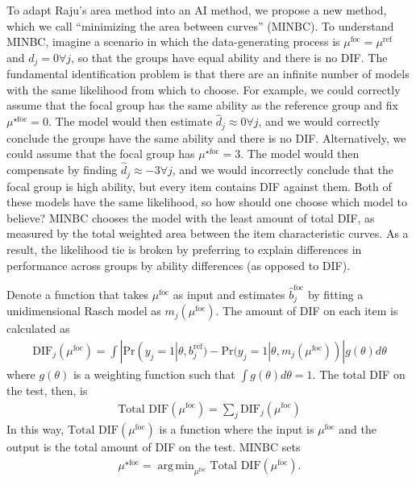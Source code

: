 \documentclass[
  11pt,
]{article}
\begin{document}
To adapt Raju's area method into an AI method, we propose a new method, which we call \enquote{minimizing the area between curves} (MINBC). To understand MINBC, imagine a scenario in which the data-generating process is \(\mu^{\text{foc}} = \mu^{\text{ref}}\) and \(d_j = 0 \forall j\), so that the groups have equal ability and there is no DIF. The fundamental identification problem is that there are an infinite number of models with the same likelihood from which to choose. For example, we could correctly assume that the focal group has the same ability as the reference group and fix \(\mu^{\star\text{foc}} = 0\). The model would then estimate \(\hat d_j \approx 0 \forall j\), and we would correctly conclude the groups have the same ability and there is no DIF. Alternatively, we could assume that the focal group has \(\mu^{\star\text{foc}} = 3\). The model would then compensate by finding \(\hat d_j \approx -3 \forall j\), and we would incorrectly conclude that the focal group is high ability, but every item contains DIF against them. Both of these models have the same likelihood, so how should one choose which model to believe? MINBC chooses the model with the least amount of total DIF, as measured by the total weighted area between the item characteristic curves. As a result, the likelihood tie is broken by preferring to explain differences in performance across groups by ability differences (as opposed to DIF).

Denote a function that takes \(\mu^\text{foc}\) as input and estimates \(\hat b_j^\text{foc}\) by fitting a unidimensional Rasch model as \(m_j(\mu^\text{foc})\). The amount of DIF on each item is calculated as
\begin{align}
\text{DIF}_j(\mu^\text{foc}) = \int |\text{Pr}(y_j = 1| \theta, b_j^{\text{ref}}) - \text{Pr}(y_j = 1| \theta, m_j(\mu^\text{foc}))| g(\theta)d\theta
\end{align}
where \(g(\theta)\) is a weighting function such that \(\int g(\theta)d\theta = 1\). The total DIF on the test, then, is
\begin{align}
\text{Total DIF}(\mu^\text{foc}) = \sum_{j} \text{DIF}_j(\mu^\text{foc})
\end{align}
In this way, \(\text{Total DIF}(\mu^\text{foc})\) is a function where the input is \(\mu^\text{foc}\) and the output is the total amount of DIF on the test. MINBC sets
\begin{align}
\mu^{\star\text{foc}} = \mathop\mathrm{arg\,min}_{\mu^\text{foc}} \text{Total DIF}(\mu^\text{foc}).
\end{align}
\end{document}
